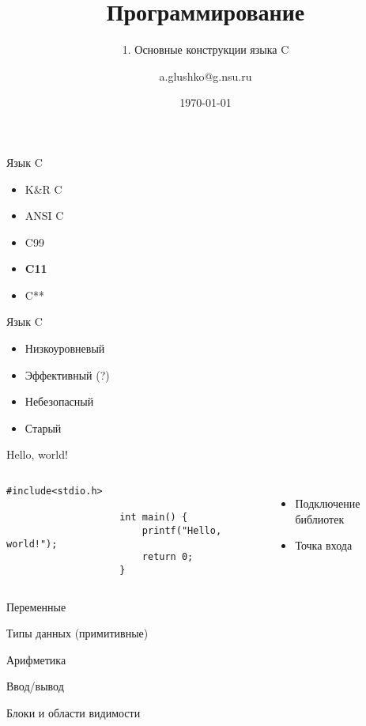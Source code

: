 \documentclass[aspectratio=169,14pt]{beamer}
\title{Программирование}
\subtitle{1. Основные конструкции языка C}
\author{a.glushko@g.nsu.ru}
\date{\today}
\begin{document}
    \begin{frame}
        \titlepage
    \end{frame}

    \begin{frame}{Язык C}
        \begin{itemize}
            \item K\&R C
            \item ANSI C
            \item C99
            \item \textbf{C11}
            \item C** %
        \end{itemize}
    \end{frame}

    \begin{frame}{Язык C}
        \begin{itemize}
            \item Низкоуровневый
            \item Эффективный (?)
            \item Небезопасный
            \item Старый
        \end{itemize}
    \end{frame}

    \begin{frame}[fragile]{Hello, world!}
        \begin{columns}
                \begin{lstlisting}[extendedchars=\true]
                    #include<stdio.h>

                    int main() {
                        printf("Hello, world!");
                        return 0;
                    }
                \end{lstlisting}
                \begin{itemize}
                    \item Подключение библиотек
                    \item Точка входа
                \end{itemize}
        \end{columns}
    \end{frame}

    \begin{frame}[fragile]{Переменные}
    \end{frame}

    \begin{frame}[fragile]{Типы данных (примитивные)}
    \end{frame}

    \begin{frame}[fragile]{Арифметика}
    \end{frame}

    \begin{frame}[fragile]{Ввод/вывод}
    \end{frame}

    \begin{frame}[fragile]{Блоки и области видимости}
    \end{frame}
\end{document}

